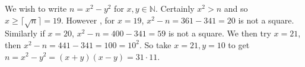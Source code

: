 We wish to write $n=x^2-y^2$ for $x,y \in \mathbb{N}$. Certainly $x^2>n$ and
so $x \ge \lceil \sqrt{n} \rceil= 19$. However , for $x=19$,
$x^2-n=361-341=20$ is not a square. Similarly if $x=20$, $x^2-n=400-341=59$
is not a square. We then try $x=21$, then $x^2-n=441-341=100=10^2$. So take
$x=21,y=10$ to get $n=x^2-y^2=(x+y)(x-y)=31 \cdot 11$.

